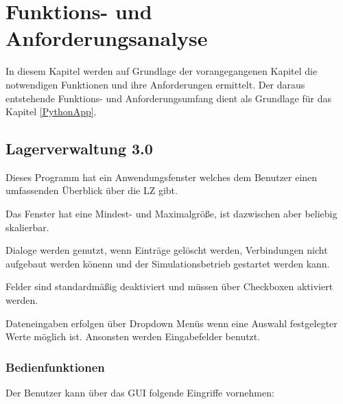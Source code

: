 \chapter{Funktions- und Anforderungsanalyse}\label{Funktionsanalyse}

In diesem Kapitel werden auf Grundlage der vorangegangenen Kapitel die notwendigen Funktionen und ihre Anforderungen ermittelt. 
Der daraus entstehende Funktions- und Anforderungsumfang dient als Grundlage für das Kapitel \ref{PythonApp}.

\section{Lagerverwaltung 3.0}
Dieses Programm hat ein Anwendungsfenster welches dem Benutzer einen umfassenden Überblick über die LZ gibt.

Das Fenster hat eine Mindest- und Maximalgröße, ist dazwischen aber beliebig skalierbar. 

Dialoge werden genutzt, wenn Einträge gelöscht werden, Verbindungen nicht aufgebaut werden könenn und der Simulationsbetrieb gestartet werden kann.

Felder sind standardmäßig deaktiviert und müssen über Checkboxen aktiviert werden. 

Dateneingaben erfolgen über Dropdown Menüs wenn eine Auswahl festgelegter Werte möglich ist. 
Ansonsten werden Eingabefelder benutzt.

\subsection{Bedienfunktionen}

Der Benutzer kann über das GUI folgende Eingriffe vornehmen:

